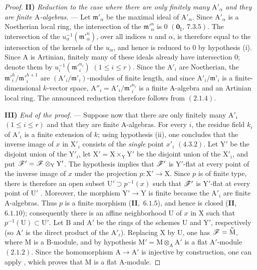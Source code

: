 \begin{proof}
\medskip
\noindent\textbf{II)} \emph{Reduction to the case where there are only finitely many $\mathrm{A}'_\alpha$ and they are finite $\mathrm{A}$-algebras.} --- Let $\mathfrak{m}'_\alpha$ be
the maximal ideal of $\mathrm{A}'_\alpha$. Since $\mathrm{A}'_\alpha$ is a Noetherian local ring, the intersection of the $\mathfrak{m}'^n_\alpha$
is $0$ $(\mathbf{0}_\mathrm{I},~7.3.5)$. The intersection of the $u_\alpha^{-1}(\mathfrak{m}'^n_\alpha)$, over all indices $n$ and $\alpha$, is therefore
equal to the intersection of the kernels of the $u_\alpha$, and hence is reduced to $0$ by hypothesis (i). Since $\mathrm{A}$
is Artinian, finitely many of these ideals already have intersection $0$; denote them by
$u_i^{-1}(\mathfrak{m}'^{n_i}_i)$ $(1\leq i\leq r)$. Since the $\mathrm{A}'_i$ are Noetherian, the $\mathfrak{m}'^h_i/\mathfrak{m}'^{h+1}_i$ are
$(\mathrm{A}'_i/\mathfrak{m}'_i)$-modules of finite length, and since $\mathrm{A}'_i/\mathfrak{m}'_i$ is a finite-dimensional $k$-vector space,
$\mathrm{A}''_i=\mathrm{A}'_i/\mathfrak{m}'^{n_i}_i$ is a finite $\mathrm{A}$-algebra and an Artinian local ring. The announced reduction
therefore follows from $(2.1.4)$.

\medskip
\noindent\textbf{III)} \emph{End of the proof.} --- Suppose now that there are only finitely many $\mathrm{A}'_i$ $(1\leq i\leq r)$ and that
they are finite $\mathrm{A}$-algebras. For every $i$, the residue field $k_i$ of $\mathrm{A}'_i$ is a finite extension of $k$; using
hypothesis (ii), one concludes that the inverse image of $x$ in $\mathrm{X}'_i$ consists of the \emph{single} point $x'_i$ $(4.3.2)$.
Let $\mathrm{Y}'$ be the disjoint union of the $\mathrm{Y}'_i$, let $\mathrm{X}'=\mathrm{X}\times_\mathrm{Y}\mathrm{Y}'$ be the disjoint union of the
$\mathrm{X}'_i$, and put $\mathscr{F}'=\mathscr{F}\otimes_\mathrm{Y}\mathrm{Y}'$. The hypothesis implies that $\mathscr{F}'$ is $\mathrm{Y}'$-flat at every
point of the inverse image of $x$ under the projection $p:\mathrm{X}'\to\mathrm{X}$. Since $p$ is of finite type, there is therefore an
open subset $\mathrm{U}'\supset p^{-1}(x)$ such that $\mathscr{F}'$ is $\mathrm{Y}'$-flat at every point of $\mathrm{U}'$ .
Moreover, the morphism $\mathrm{Y}'\to\mathrm{Y}$ is finite because the $\mathrm{A}'_i$ are finite $\mathrm{A}$-algebras. Thus $p$ is a finite
morphism (\textbf{II},~$6.1.5$), and hence is closed (\textbf{II},~$6.1.10$); consequently there is an affine neighborhood $\mathrm{U}$ of
$x$ in $\mathrm{X}$ such that $p^{-1}(\mathrm{U})\subset\mathrm{U}'$. Let $\mathrm{B}$ and $\mathrm{A}'$ be the rings of the schemes
$\mathrm{U}$ and $\mathrm{Y}'$, respectively (so $\mathrm{A}'$ is the direct product of the $\mathrm{A}'_i$). Replacing $\mathrm{X}$ by
$\mathrm{U}$, one has $\mathscr{F}=\widetilde{\mathrm{M}}$, where $\mathrm{M}$ is a $\mathrm{B}$-module, and by hypothesis
$\mathrm{M}'=\mathrm{M}\otimes_\mathrm{A}\mathrm{A}'$ is a flat $\mathrm{A}'$-module $(2.1.2)$. Since the homomorphism
$\mathrm{A}\to\mathrm{A}'$ is injective by construction, one can apply , which proves that $\mathrm{M}$ is a flat
$\mathrm{A}$-module.
\end{proof}

